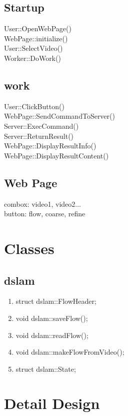 \documentclass{article}
\begin{document}
\subsection{Startup}

User::OpenWebPage()\\
\indent WebPage::initialize()\\
\indent User::SelectVideo()\\
\indent Worker::DoWork()

\subsection{work}
User::ClickButton()\\
\indent WebPage::SendCommandToServer()\\
\indent Server::ExecCommand()\\
\indent Server::ReturnResult()\\
\indent \indent WebPage::DisplayResultInfo()\\
\indent \indent WebPage::DisplayResultContent()

\subsection{Web Page}

combox: video1, video2...\\
button: flow, coarse, refine

\section{Classes}

\subsection{dslam}

\begin{enumerate}

\item struct dslam::FlowHeader;
\item void dslam::saveFlow();
\item void dslam::readFlow();
\item void dslam::makeFlowFromVideo();
\item struct dslam::State;
\end{enumerate}

\section{Detail Design}
\end{document}
